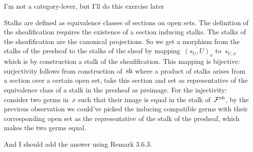 \begin{exercise}
  \label{exercise:34l}
  I'm not a category-lover, but I'll do this exercise later
\end{exercise}

\begin{exercise}
  \label{exercise:34m}
  Stalks are defined as equivalence classes of sections on open sets. The definition of the sheafification requires the existence of a section inducing stalks. The stalks of the sheafification are the canonical projections. So we get a morphism from the stalks of the presheaf to the stalks of the sheaf by mapping~$\overline{(s_U,U)}_x$ to~$s_{U,x}$ which is by construction a stalk of the sheafification. This mapping is bijective: surjectivity follows from construction of~$\operatorname{sh}$ where a product of stalks arises from a section over a certain open set, take this section and set as representative of the equivalence class of a stalk in the presheaf as preimage. For the injectivity: consider two germs in~$x$ such that their image is equal in the stalk of~$\mathcal{F}^{\operatorname{sh}}$, by the previous observation we could've picked the inducing compatible germs with their corresponding open set as the representative of the stalk of the presheaf, which makes the two germs equal.

  And I should add the answer using Remark 3.6.3.
\end{exercise}

